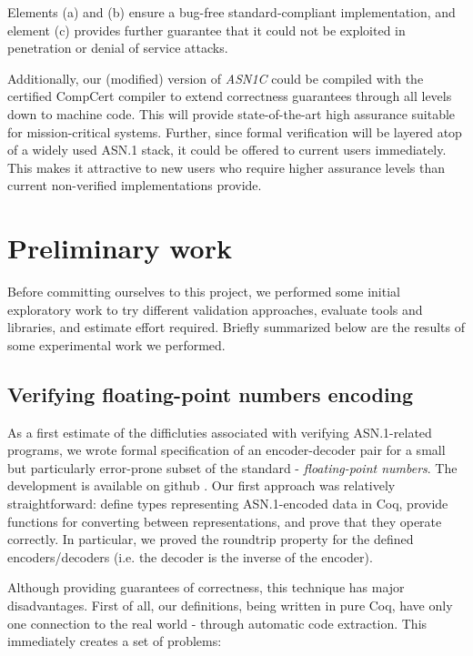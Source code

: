 \documentclass[10p,conference]{IEEEtran}
\begin{document}
Elements (a) and (b) ensure a bug-free standard-compliant implementation, and
element (c) provides further guarantee that it could not be exploited
in penetration or denial of service attacks.

Additionally, our (modified) version of \emph{ASN1C} could be compiled with
the certified CompCert compiler \cite{CompCert} to extend correctness
guarantees through all levels down to machine code. This will provide state-of-the-art high
assurance suitable for mission-critical systems. Further, since formal
verification will be layered atop of a widely used ASN.1 stack, it
could be offered to current users immediately. This makes it attractive to new users who require higher
assurance levels than current non-verified implementations provide.

\section{Preliminary work}

Before committing ourselves to this project, we performed some initial
exploratory work to try different validation approaches, evaluate
tools and libraries, and estimate effort required. Briefly summarized
below are the results of some experimental work we performed.

\subsection{Verifying floating-point numbers encoding}

As a first estimate of the difficluties associated with verifying
ASN.1-related programs, we wrote formal specification of an
encoder-decoder pair for a small but particularly error-prone subset
of the standard - \textit{floating-point numbers}. The development is
available on github \cite{asn1fpcoq}. Our first approach was
relatively straightforward: define types representing ASN.1-encoded
data in Coq, provide functions for converting between representations,
and prove that they operate correctly. In particular, we proved the
roundtrip property for the defined encoders/decoders (i.e. the decoder is the inverse of the encoder).

Although providing guarantees of correctness, this technique has major disadvantages.
First of all, our definitions, being written in pure Coq, have only one
connection to the real world - through automatic code extraction.
This immediately creates a set of problems:
\end{document}
